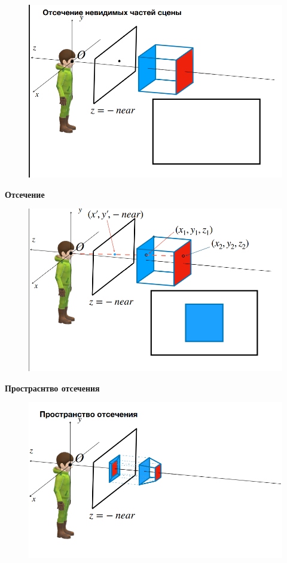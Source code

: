 \documentclass{article}
\begin{document}
\begin{figure} [H]
    \includegraphics[width=0.70\linewidth]{Снимок экрана 2025-04-07 121652.png}
\end{figure}


\textbf{Отсечение}

\begin{figure} [H]
    \includegraphics[width=0.70\linewidth]{Снимок экрана 2025-04-07 121741.png}
\end{figure}

\vspace{5cm}

\textbf{Простраснтво отсечения}

\begin{figure} [H]
    \includegraphics[width=0.70\linewidth]{Снимок экрана 2025-04-07 121816.png}
\end{figure}
\end{document}
